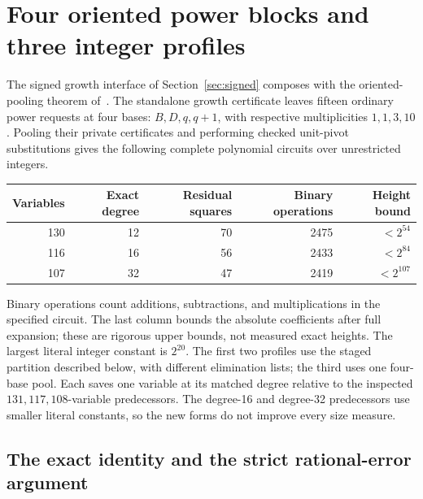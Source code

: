\section{Four oriented power blocks and three integer profiles}
\label{sec:pooling}

The signed growth interface of Section~\ref{sec:signed} composes with the
oriented-pooling theorem of~\cite{signedhorizons}. The standalone growth
certificate leaves fifteen ordinary power requests at four bases:
\(B,D,q,q+1\), with respective multiplicities \(1,1,3,10\).
Pooling their private certificates and performing checked unit-pivot
substitutions gives the following complete polynomial circuits over
unrestricted integers.

\begin{center}
\begin{tabular}{rrrrr}
\toprule
Variables & Exact degree & Residual squares & Binary operations & Height bound\\
\midrule
130 & 12 & 70 & 2475 & \(<2^{54}\)\\
116 & 16 & 56 & 2433 & \(<2^{84}\)\\
107 & 32 & 47 & 2419 & \(<2^{107}\)\\
\bottomrule
\end{tabular}
\end{center}
Binary operations count additions, subtractions, and multiplications in the
specified circuit. The last column bounds the absolute coefficients after
full expansion; these are rigorous upper bounds, not measured exact heights.
The largest literal integer constant is \(2^{20}\). The first two profiles
use the staged partition described below, with different elimination lists;
the third uses one four-base pool. Each saves one variable at its matched
degree relative to the inspected \(131,117,108\)-variable predecessors.
The degree-16 and degree-32 predecessors use smaller literal constants,
so the new forms do not improve every size measure.

\subsection{The exact identity and the strict rational-error argument}

